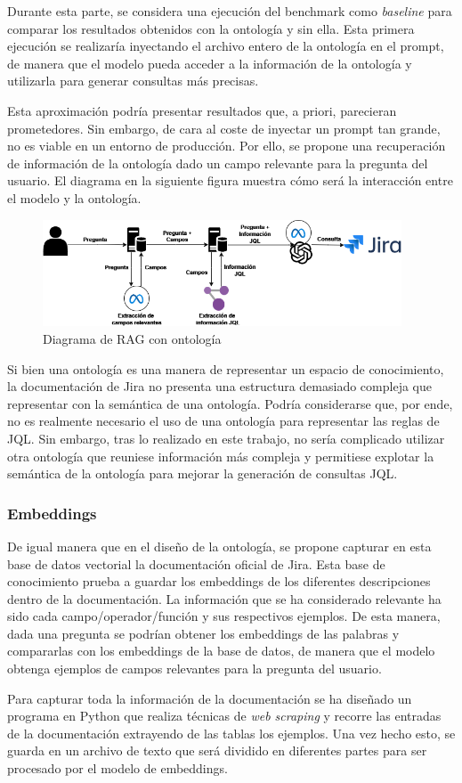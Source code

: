 Durante esta parte, se considera una ejecución del benchmark como \textit{baseline} para comparar los resultados obtenidos con la ontología y sin ella. Esta primera ejecución se realizaría inyectando el archivo entero de la ontología en el prompt, de manera que el modelo pueda acceder a la información de la ontología y utilizarla para generar consultas más precisas.

Esta aproximación podría presentar resultados que, a priori, parecieran prometedores. Sin embargo, de cara al coste de inyectar un prompt tan grande, no es viable en un entorno de producción. Por ello, se propone una recuperación de información de la ontología dado un campo relevante para la pregunta del usuario. El diagrama en la siguiente figura muestra cómo será la interacción entre el modelo y la ontología.
\begin{figure}[H]
    \centering
    \includegraphics[width=0.95\textwidth]{images/rag_ontologia.png}
    \caption{Diagrama de RAG con ontología}\label{fig:ontologia}
\end{figure}
Si bien una ontología es una manera de representar un espacio de conocimiento, la documentación de Jira no presenta una estructura demasiado compleja que representar con la semántica de una ontología. Podría considerarse que, por ende, no es realmente necesario el uso de una ontología para representar las reglas de JQL. Sin embargo, tras lo realizado en este trabajo, no sería complicado utilizar otra ontología que reuniese información más compleja y permitiese explotar la semántica de la ontología para mejorar la generación de consultas JQL.

\subsubsection{Embeddings}
De igual manera que en el diseño de la ontología, se propone capturar en esta base de datos vectorial la documentación oficial de Jira. Esta base de conocimiento prueba a guardar los embeddings de los diferentes descripciones dentro de la documentación. La información que se ha considerado relevante ha sido cada campo/operador/función y sus respectivos ejemplos. De esta manera, dada una pregunta se podrían obtener los embeddings de las palabras y compararlas con los embeddings de la base de datos, de manera que el modelo obtenga ejemplos de campos relevantes para la pregunta del usuario.

Para capturar toda la información de la documentación se ha diseñado un programa en Python que realiza técnicas de \textit{web scraping} y recorre las entradas de la documentación extrayendo de las tablas los ejemplos. Una vez hecho esto, se guarda en un archivo de texto que será dividido en diferentes partes para ser procesado por el modelo de embeddings.
